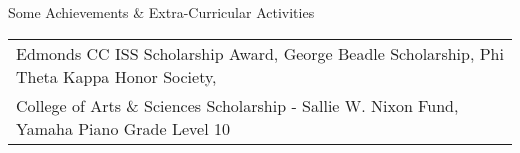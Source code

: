 \documentclass{resume} %
\begin{document}
\begin{rSection}{Some Achievements \& Extra-Curricular Activities} 

\begin{tabular}{@{\hspace{6ex}} l }
Edmonds CC ISS Scholarship Award, George Beadle Scholarship, Phi Theta Kappa Honor Society,\\
College of Arts \& Sciences Scholarship - Sallie W. Nixon Fund, Yamaha Piano Grade Level 10\\
\end{tabular}

\end{rSection}
\end{document}
